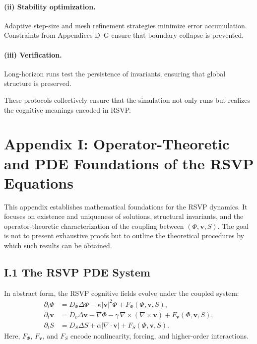 \documentclass[12pt]{article}
\begin{document}
\paragraph{(ii) Stability optimization.}  
Adaptive step-size and mesh refinement strategies minimize error accumulation.  
Constraints from Appendices D–G ensure that boundary collapse is prevented.

\paragraph{(iii) Verification.}  
Long-horizon runs test the persistence of invariants, ensuring that global 
structure is preserved.

These protocols collectively ensure that the simulation not only runs but 
realizes the cognitive meanings encoded in RSVP.

\newpage
\section*{Appendix I: Operator-Theoretic and PDE Foundations of the RSVP Equations}

This appendix establishes mathematical foundations for the RSVP dynamics.  
It focuses on existence and uniqueness of solutions, structural invariants, 
and the operator-theoretic characterization of the coupling between 
$(\Phi, \mathbf{v}, S)$.  The goal is not to present exhaustive proofs but to 
outline the theoretical procedures by which such results can be obtained.

\subsection*{I.1 The RSVP PDE System}

In abstract form, the RSVP cognitive fields evolve under the coupled system:
\[
\begin{aligned}
\partial_t \Phi &= D_\Phi \Delta \Phi - \kappa |\mathbf{v}|^2 \Phi 
                  + F_\Phi(\Phi, \mathbf{v}, S), \\
\partial_t \mathbf{v} &= D_v \Delta \mathbf{v} 
                  - \nabla \Phi - \gamma \,\nabla \times (\nabla \times \mathbf{v})
                  + F_{\mathbf{v}}(\Phi, \mathbf{v}, S), \\
\partial_t S &= D_S \Delta S + \alpha |\nabla \cdot \mathbf{v}| 
                  + F_S(\Phi, \mathbf{v}, S).
\end{aligned}
\]
Here, $F_\Phi$, $F_{\mathbf{v}}$, and $F_S$ encode nonlinearity, forcing, and 
higher-order interactions.
\end{document}
